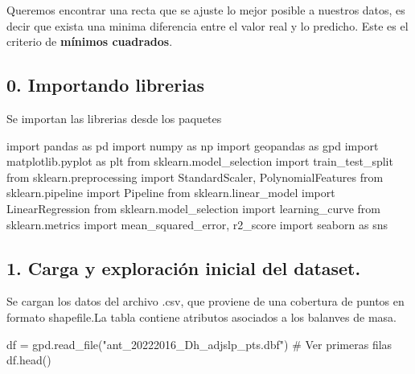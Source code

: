 \documentclass[
  letterpaper,
  DIV=11,
  numbers=noendperiod]{scrartcl}
\newenvironment{Shaded}{\begin{snugshade}}{\end{snugshade}}
\newcommand{\CommentTok}[1]{\textcolor[rgb]{0.37,0.37,0.37}{#1}}
\newcommand{\ImportTok}[1]{\textcolor[rgb]{0.00,0.46,0.62}{#1}}
\newcommand{\NormalTok}[1]{\textcolor[rgb]{0.00,0.23,0.31}{#1}}
\newcommand{\OperatorTok}[1]{\textcolor[rgb]{0.37,0.37,0.37}{#1}}
\newcommand{\StringTok}[1]{\textcolor[rgb]{0.13,0.47,0.30}{#1}}
\begin{document}
Queremos encontrar una recta que se ajuste lo mejor posible a nuestros
datos, es decir que exista una minima diferencia entre el valor real y
lo predicho. Este es el criterio de \textbf{mínimos cuadrados}.

\subsection{0. Importando librerias}\label{importando-librerias}

Se importan las librerias desde los paquetes

\begin{Shaded}
\begin{Highlighting}[]
\ImportTok{import}\NormalTok{ pandas }\ImportTok{as}\NormalTok{ pd}
\ImportTok{import}\NormalTok{ numpy }\ImportTok{as}\NormalTok{ np}
\ImportTok{import}\NormalTok{ geopandas }\ImportTok{as}\NormalTok{ gpd}
\ImportTok{import}\NormalTok{ matplotlib.pyplot }\ImportTok{as}\NormalTok{ plt}
\ImportTok{from}\NormalTok{ sklearn.model\_selection }\ImportTok{import}\NormalTok{ train\_test\_split}
\ImportTok{from}\NormalTok{ sklearn.preprocessing }\ImportTok{import}\NormalTok{ StandardScaler, PolynomialFeatures}
\ImportTok{from}\NormalTok{ sklearn.pipeline }\ImportTok{import}\NormalTok{ Pipeline}
\ImportTok{from}\NormalTok{ sklearn.linear\_model }\ImportTok{import}\NormalTok{ LinearRegression}
\ImportTok{from}\NormalTok{ sklearn.model\_selection }\ImportTok{import}\NormalTok{ learning\_curve}
\ImportTok{from}\NormalTok{ sklearn.metrics }\ImportTok{import}\NormalTok{ mean\_squared\_error, r2\_score}
\ImportTok{import}\NormalTok{ seaborn }\ImportTok{as}\NormalTok{ sns}
\end{Highlighting}
\end{Shaded}

\subsection{1. Carga y exploración inicial del
dataset.}\label{carga-y-exploraciuxf3n-inicial-del-dataset.}

Se cargan los datos del archivo .csv, que proviene de una cobertura de
puntos en formato shapefile.La tabla contiene atributos asociados a los
balanves de masa.

\begin{Shaded}
\begin{Highlighting}[]
\NormalTok{df }\OperatorTok{=}\NormalTok{ gpd.read\_file(}\StringTok{"ant\_20222016\_Dh\_adjslp\_pts.dbf"}\NormalTok{)}
\CommentTok{\# Ver primeras filas}
\NormalTok{df.head()}
\end{Highlighting}
\end{Shaded}
\end{document}
